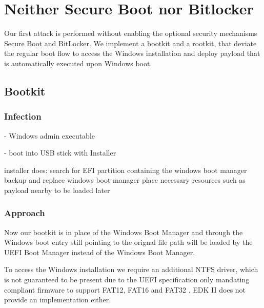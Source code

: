 
\section{Neither Secure Boot nor Bitlocker}

Our first attack is performed without enabling the optional security mechanisms Secure Boot and BitLocker.
We implement a bootkit and a rootkit, that deviate the regular boot flow to access the Windows installation and deploy payload that is automatically executed upon Windows boot.

\subsection{Bootkit}

\subsubsection{Infection}


- Windows admin executable

- boot into USB stick with Installer

installer does:
search for EFI partition containing the windows boot manager
backup and replace windows boot manager
place necessary resources such as payload nearby to be loaded later

\subsubsection{Approach}

Now our bootkit is in place of the Windows Boot Manager and through the Windows boot entry still pointing to the orignal file path will be loaded by the UEFI Boot Manager instead of the Windows Boot Manager.

To access the Windows installation we require an additional NTFS driver, which is not guaranteed to be present due to the UEFI specification only mandating compliant firmware to support FAT12, FAT16 and FAT32 \cite[13.3.1.1]{uefi-spec}. EDK II does not provide an implementation either.

